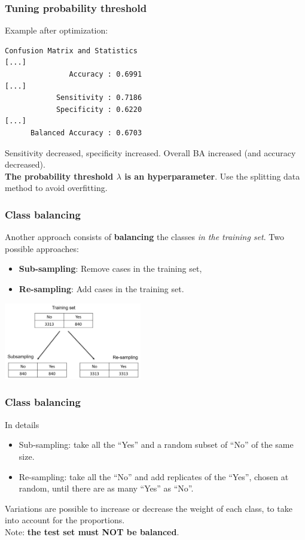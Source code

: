 \begin{frame}[fragile]
\frametitle{Tuning probability threshold}
Example after optimization:\\
\scriptsize
\begin{verbatim}
Confusion Matrix and Statistics
[...]                     
               Accuracy : 0.6991          
[...]
            Sensitivity : 0.7186          
            Specificity : 0.6220          
[...]
      Balanced Accuracy : 0.6703  
\end{verbatim}
\normalsize
Sensitivity decreased, specificity increased. Overall BA increased (and accuracy decreased).\\
\vspace{0.3cm}
{\bf The probability threshold $\lambda$ is an hyperparameter}. Use the splitting data method to avoid overfitting.
\end{frame}
\begin{frame}
\frametitle{Class balancing}
Another approach consists of {\bf balancing} the classes {\it in the training set}. Two possible approaches:
\begin{itemize}
\item {\bf Sub-sampling}: Remove cases in the training set,
\item {\bf Re-sampling}: Add cases in the training set.
\end{itemize}
\begin{center}
\includegraphics[width=6cm]{../Graphs/Balancing.png}
\end{center}
\end{frame}
\begin{frame}
\frametitle{Class balancing}
In details
\begin{itemize}
\item Sub-sampling: take all the ``Yes'' and a random subset of ``No'' of the same size.
\item Re-sampling: take all the ``No'' and add replicates of the ``Yes'', chosen at random, until there are as many ``Yes'' as ``No''.
\end{itemize}
Variations are possible to increase or decrease the weight of each class, to take into account for the proportions.\\
\vspace{0.3cm}
Note: {\bf the test set must NOT be balanced}.
\end{frame}
